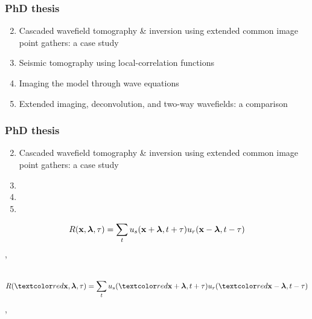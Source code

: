 \begin{frame} \frametitle{PhD thesis}
  \Large

  \begin{enumerate}
  \setcounter{enumi}{1}    
    \item Cascaded wavefield tomography \& inversion using extended common image point gathers: a case study
    \item Seismic tomography using local-correlation functions
    \item Imaging the model through wave equations 
    \item Extended imaging, deconvolution, and two-way wavefields: a comparison
  \end{enumerate} 
\end{frame}



\begin{frame} \frametitle{PhD thesis}
  \Large

  \begin{enumerate}
  \setcounter{enumi}{1}    
    \item Cascaded wavefield tomography \& inversion using extended common image point gathers: a case study
    \item {}
    \item {}
    \item {}
  \end{enumerate} 
\end{frame}





\begin{frame}
  \[
     R({\bf x},{\boldsymbol{\lambda}},\tau) =
     \sum_{t} u_s({\bf x}+{\boldsymbol{\lambda}},t+\tau) u_r({\bf x}-{\boldsymbol{\lambda}},t-\tau)
  \]
\sep  
   \\ 
  \\
\end{frame}

\begin{frame}
  \[
     R(\red{\xx},\hh,\tau) =
     \sum_{t} u_s(\red{\xx}+\hh,t+\tau) u_r(\red{\xx}-\hh,t-\tau)
  \]
\sep  
   \\ 
  \\

\end{frame}

